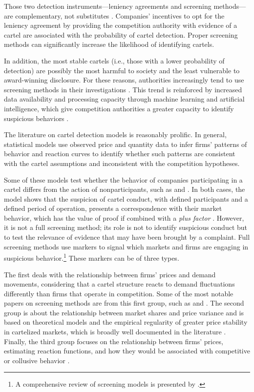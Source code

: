 Those two detection instruments---leniency agreements and screening methods---are complementary, not substitutes \citep{hüschelrath2014cartel,schinkel2013balancing}. Companies' incentives to opt for the leniency agreement by providing the competition authority with evidence of a cartel are associated with the probability of cartel detection. Proper screening methods can significantly increase the likelihood of identifying cartels.

In addition, the most stable cartels (i.e., those with a lower probability of detection) are possibly the most harmful to society and the least vulnerable to award-winning disclosure. For these reasons, authorities increasingly tend to use screening methods in their investigations \citep{schinkel2013balancing,imhof2018screening}. This trend is reinforced by increased data availability and processing capacity through machine learning and artificial intelligence, which give competition authorities a greater capacity to identify suspicious behaviors \citep{sanchezgraells2019screening}.

The literature on cartel detection models is reasonably prolific. In general, statistical models use observed price and quantity data to infer firms' patterns of behavior and reaction curves to identify whether such patterns are consistent with the cartel assumptions and inconsistent with the competition hypotheses.

Some of these models test whether the behavior of companies participating in a cartel differs from the action of nonparticipants, such as \citet{porter1993detection} and \citet{porter1999ohio}. In both cases, the model shows that the suspicion of cartel conduct, with defined participants and a defined period of operation, presents a correspondence with their market behavior, which has the value of proof if combined with a \textit{plus factor} \citep{hovenkamp2005federal}. However, it is not a full screening method; its role is not to identify suspicious conduct but to test the relevance of evidence that may have been brought by a complaint. Full screening methods use markers to signal which markets and firms are engaging in suspicious behavior.\footnote{A comprehensive review of screening models is presented by \citet{harrington2008detecting}.} These markers can be of three types.

The first deals with the relationship between firms' prices and demand movements, considering that a cartel structure reacts to demand fluctuations differently than firms that operate in competition. Some of the most notable papers on screening methods are from this first group, such as \citet{green1984noncooperative} and \citet{haltiwanger1991the}. The second group is about the relationship between market shares and price variance and is based on theoretical models and the empirical regularity of greater price stability in cartelized markets, which is broadly well documented in the literature \citep{abrantesmetz2006a,imhof2019detecting}. Finally, the third group focuses on the relationship between firms' prices, estimating reaction functions, and how they would be associated with competitive or collusive behavior \citep{bajari2003deciding}.

